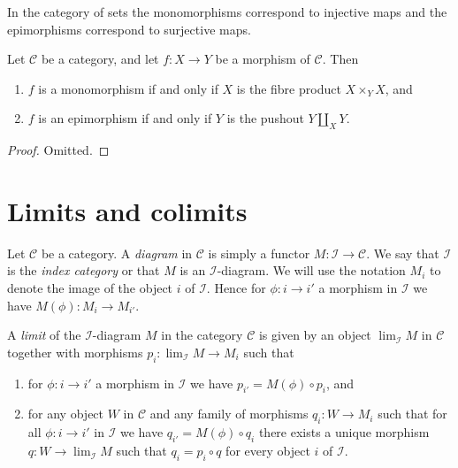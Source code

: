 \begin{example}
\label{example-mono-epi-sets}
In the category of sets the monomorphisms correspond to injective
maps and the epimorphisms correspond to surjective maps.
\end{example}

\begin{lemma}
\label{lemma-characterize-mono-epi}
Let $\mathcal{C}$ be a category, and let $f : X \to Y$ be
a morphism of $\mathcal{C}$. Then
\begin{enumerate}
\item $f$ is a monomorphism if and only if $X$ is the fibre
product $X \times_Y X$, and
\item $f$ is an epimorphism if and only if $Y$ is the pushout
$Y \amalg_X Y$.
\end{enumerate}
\end{lemma}

\begin{proof}
Omitted.
\end{proof}





\section{Limits and colimits}
\label{section-limits}

\noindent
Let $\mathcal{C}$ be a category. A {\it diagram} in $\mathcal{C}$ is
simply a functor $M : \mathcal{I} \to \mathcal{C}$. We say that
$\mathcal{I}$ is the {\it index category} or that $M$ is an
$\mathcal{I}$-diagram. We will use the notation $M_i$ to denote the
image of the object
$i$ of $\mathcal{I}$. Hence for $\phi : i \to i'$ a morphism
in $\mathcal{I}$ we have $M(\phi) : M_i \to M_{i'}$.

\begin{definition}
\label{definition-limit}
A {\it limit} of the $\mathcal{I}$-diagram $M$ in the category
$\mathcal{C}$ is given by an object $\lim_\mathcal{I} M$ in $\mathcal{C}$
together with morphisms $p_i : \lim_\mathcal{I} M \to M_i$ such that
\begin{enumerate}
\item for $\phi : i \to i'$ a morphism
in $\mathcal{I}$ we have $p_{i'} =  M(\phi) \circ p_i$, and
\item for any object $W$ in $\mathcal{C}$ and any family of
morphisms $q_i : W \to M_i$ such that for all $\phi : i \to i'$
in $\mathcal{I}$ we have $q_{i'} = M(\phi) \circ q_i$ there
exists a unique morphism $q : W \to \lim_\mathcal{I} M$ such that
$q_i = p_i \circ q$ for every object $i$ of $\mathcal{I}$.
\end{enumerate}
\end{definition}

